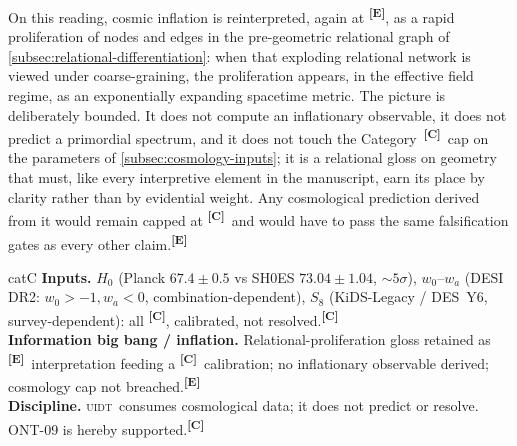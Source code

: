 \documentclass[12pt,a4paper,twoside]{article}
\theoremstyle{plain}
\theoremstyle{definition}
\theoremstyle{remark}
\newcommand{\UIDT}{\textsc{uidt}}
\newcommand{\catmark}[1]{\textsuperscript{\textsf{\textbf{[#1]}}}}
\begin{document}
On this reading, cosmic inflation is reinterpreted, again at \catmark{E}, as a rapid proliferation of nodes and edges in the pre-geometric relational graph of \cref{subsec:relational-differentiation}: when that exploding relational network is viewed under coarse-graining, the proliferation appears, in the effective field regime, as an exponentially expanding spacetime metric. The picture is deliberately bounded. It does not compute an inflationary observable, it does not predict a primordial spectrum, and it does not touch the Category~\catmark{C}\ cap on the parameters of \cref{subsec:cosmology-inputs}; it is a relational gloss on geometry that must, like every interpretive element in the manuscript, earn its place by clarity rather than by evidential weight. Any cosmological prediction derived from it would remain capped at \catmark{C}\ and would have to pass the same falsification gates as every other claim.\catmark{E}

\begin{evidencebox}{catC}
\textbf{Inputs.} $H_0$ (Planck $67.4\pm0.5$ vs SH0ES $73.04\pm1.04$, $\sim5\sigma$), $w_0$--$w_a$ (DESI DR2: $w_0>-1,w_a<0$, combination-dependent), $S_8$ (KiDS-Legacy / DES~Y6, survey-dependent): all \catmark{C}, calibrated, not
resolved.\catmark{C}\\[0.3em]
\textbf{Information big bang / inflation.} Relational-proliferation gloss retained as \catmark{E}\ interpretation feeding a \catmark{C}\ calibration; no inflationary
observable derived; cosmology cap not breached.\catmark{E}\\[0.3em]
\textbf{Discipline.} \UIDT\ consumes cosmological data; it does not predict or resolve. ONT-09 is hereby supported.\catmark{C}
\end{evidencebox}

\end{document}
